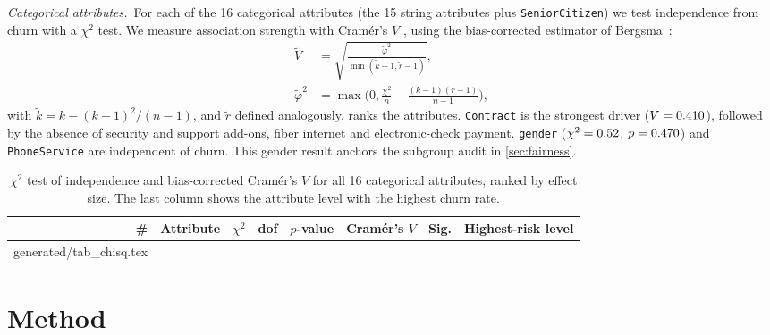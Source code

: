 \documentclass[conference]{IEEEtran}
\makeatletter
\newcommand{\genrows}[1]{\@@input generated/#1.tex }
\newcommand{\code}[1]{\texttt{#1}}
\newcommand{\para}[1]{\par\textit{#1.}\ }%
\makeatother
\begin{document}
\para{Categorical attributes}For each of the 16 categorical attributes (the 15 string
attributes plus \code{SeniorCitizen}) we test independence from churn with a $\chi^2$ test. We
measure association strength with Cram\'er's $V$ \cite{cramer1946mathematical}, using the
bias-corrected estimator of Bergsma~\cite{bergsma2013bias}:
\begin{align}
  \tilde V &= \sqrt{\frac{\tilde\varphi^2}{\min(\tilde k-1,\tilde r-1)}},\label{eq:cramer}\\
  \tilde\varphi^2 &= \max\!\Big(0,\frac{\chi^2}{n}-\frac{(k-1)(r-1)}{n-1}\Big),\nonumber
\end{align}
with $\tilde k=k-(k-1)^2/(n-1)$, and $\tilde r$ defined analogously.  ranks the
attributes. \code{Contract} is the strongest driver ($V=0.410$), followed by the absence
of security and support add-ons, fiber internet and electronic-check payment. \code{gender}
($\chi^2=0.52$, $p=0.470$) and \code{PhoneService} are independent of churn. This
gender result anchors the subgroup audit in \cref{sec:fairness}.

\begin{table}[t]
\centering
\caption{$\chi^2$ test of independence and bias-corrected Cram\'er's $V$ for all 16 categorical
attributes, ranked by effect size. The last column shows the attribute level with the highest
churn rate.}
\label{tab:chisq}
\small
\begin{tabular}{@{}r l r r r l c l@{}}
\toprule
\textbf{\#} & \textbf{Attribute} & $\chi^2$ & dof & $p$-value & \textbf{Cram\'er's $V$} & Sig. & \textbf{Highest-risk level}\\
\midrule
\genrows{tab_chisq}
\bottomrule
\end{tabular}
\end{table}

\section{Method}
\label{sec:method}
\end{document}
